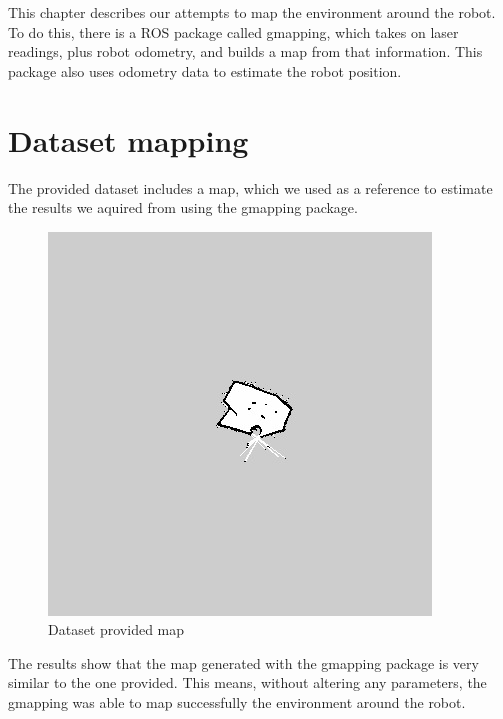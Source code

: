 \cleardoublepage
\label{chap:back}

This chapter describes our attempts to map the environment around the robot. To do this, there is a ROS package called gmapping, which takes on laser readings, plus robot odometry, and builds a map from that information. This package also uses odometry data to estimate the robot position.
\section{Dataset mapping}
The provided dataset includes a map, which we used as a reference to estimate the results we aquired from using the gmapping package.

\begin{figure}[h]
\centering
\includegraphics[scale=0.6]{./Images/map}
\caption{Dataset provided map}
\label{fig:flowchart}
\end{figure}

The results show that the map generated with the gmapping package is very similar to the one provided. This means, without altering any parameters, the gmapping was able to map successfully the environment around the robot. 

